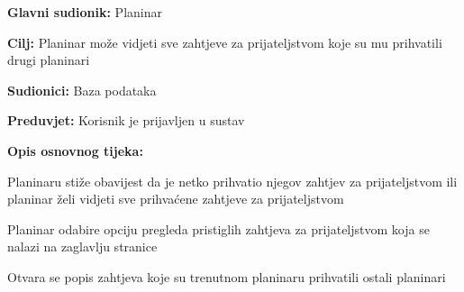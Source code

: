 		\noindent {}
		\begin{packed_item}
			
			\item \textbf{Glavni sudionik: }$ $Planinar$ $
			\item  \textbf{Cilj:} $ $Planinar može vidjeti sve zahtjeve za prijateljstvom koje su mu prihvatili drugi planinari $ $
			\item  \textbf{Sudionici:} $ $Baza podataka $ $
			\item  \textbf{Preduvjet:} $ $Korisnik je prijavljen u sustav$ $
			\item  \textbf{Opis osnovnog tijeka:}
			
			\item[] \begin{packed_enum}
				
				\item $ $Planinaru stiže obavijest da je netko prihvatio njegov zahtjev za prijateljstvom ili planinar želi vidjeti sve prihvaćene zahtjeve za prijateljstvom$ $
				\item $ $Planinar odabire opciju pregleda pristiglih zahtjeva za prijateljstvom koja se nalazi na zaglavlju stranice$ $
				\item $ $Otvara se popis zahtjeva koje su trenutnom planinaru prihvatili ostali planinari$ $
				
			\end{packed_enum}
		\end{packed_item}


